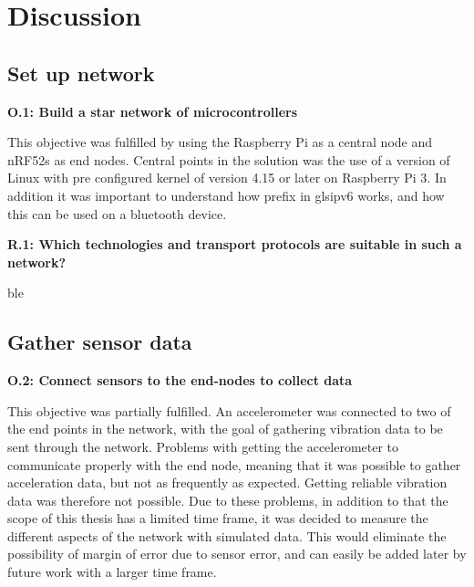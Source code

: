 \chapter{Discussion}
\label{chp:dataAnalysis}


\section{Set up network}

\noindent \textbf{O.1: Build a star network of microcontrollers}

This objective was fulfilled by using the Raspberry Pi as a central node and nRF52s as end nodes. Central points in the solution was the use of a version of Linux with pre configured kernel of version 4.15 or later on Raspberry Pi 3. In addition it was important to understand how prefix in gls{ipv6} works, and how this can be used on a bluetooth device.


\noindent \textbf{R.1: Which technologies and transport protocols are suitable in such a network?}

\gls{ble} 

\section{Gather sensor data}

\noindent\textbf{O.2: Connect sensors to the end-nodes to collect data}

This objective was partially fulfilled. An accelerometer was connected to two of the end points in the network, with the goal of gathering vibration data to be sent through the network. Problems with getting the accelerometer to communicate properly with the end node, meaning that it was possible to gather acceleration data, but not as frequently as expected. Getting reliable vibration data was therefore not possible. Due to these problems, in addition to that the scope of this thesis has a limited time frame, it was decided to measure the different aspects of the network with simulated data. This would eliminate the possibility of margin of error due to sensor error, and can easily be added later by future work with a larger time frame. 


